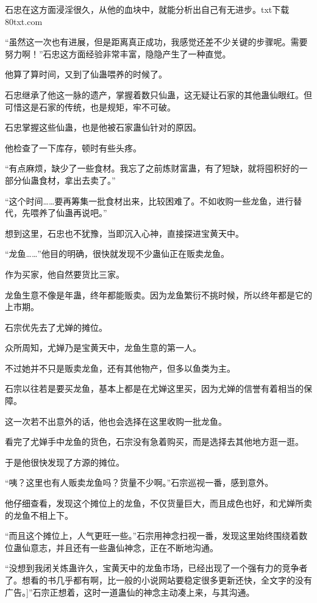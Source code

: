 
\begin{this_body}

石忠在这方面浸淫很久，从他的血块中，就能分析出自己有无进步。txt下载80txt.com

“虽然这一次也有进展，但是距离真正成功，我感觉还差不少关键的步骤呢。需要努力啊！”石忠这方面经验非常丰富，隐隐产生了一种直觉。

他算了算时间，又到了仙蛊喂养的时候了。

石忠继承了他这一脉的遗产，掌握着数只仙蛊，这无疑让石家的其他蛊仙眼红。但可惜这是石家的传统，也是规矩，牢不可破。

石忠掌握这些仙蛊，也是他被石家蛊仙针对的原因。

他检查了一下库存，顿时有些头疼。

“有点麻烦，缺少了一些食材。我忘了之前炼财富蛊，有了短缺，就将囤积好的一部分仙蛊食材，拿出去卖了。”

“这个时间……要再筹集一批食材出来，比较困难了。不如收购一些龙鱼，进行替代，先喂养了仙蛊再说吧。”

想到这里，石忠也不犹豫，当即沉入心神，直接探进宝黄天中。

“龙鱼……”他目的明确，很快就发现不少蛊仙正在贩卖龙鱼。

作为买家，他自然要货比三家。

龙鱼生意不像是年蛊，终年都能贩卖。因为龙鱼繁衍不挑时候，所以终年都是它的上市期。

石宗优先去了尤婵的摊位。

众所周知，尤婵乃是宝黄天中，龙鱼生意的第一人。

不过她并不只是贩卖龙鱼，还有其他物产，但多以鱼类为主。

石宗以往若是要买龙鱼，基本上都是在尤婵这里买，因为尤婵的信誉有着相当的保障。

这一次若不出意外的话，他也会选择在这里收购一批龙鱼。

看完了尤婵手中龙鱼的货色，石宗没有急着购买，而是选择去其他地方逛一逛。

于是他很快发现了方源的摊位。

“咦？这里也有人贩卖龙鱼吗？货量不少啊。”石宗巡视一番，感到意外。

他仔细查看，发现这个摊位上的龙鱼，不仅货量巨大，而且成色也好，和尤婵所卖的龙鱼不相上下。

“而且这个摊位上，人气更旺一些。”石宗用神念扫视一番，发现这里始终围绕着数位蛊仙意志，并且还有一些蛊仙神念，正在不断地沟通。

“没想到我闭关炼蛊许久，宝黄天中的龙鱼市场，已经出现了一个强有力的竞争者了。想看的书几乎都有啊，比一般的小说网站要稳定很多更新还快，全文字的没有广告。]”石宗正想着，这时一道蛊仙的神念主动凑上来，与其沟通。


\end{this_body}
